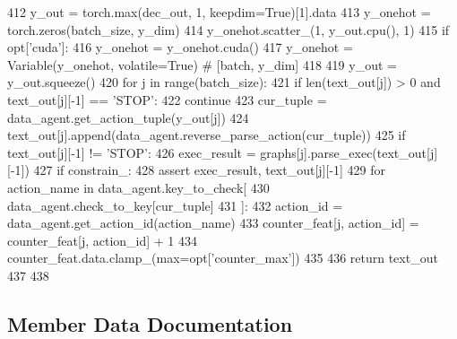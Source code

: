 \begin{DoxyCode}
412             y\_out = torch.max(dec\_out, 1, keepdim=\textcolor{keyword}{True})[1].data
413             y\_onehot = torch.zeros(batch\_size, y\_dim)
414             y\_onehot.scatter\_(1, y\_out.cpu(), 1)
415             \textcolor{keywordflow}{if} opt[\textcolor{stringliteral}{'cuda'}]:
416                 y\_onehot = y\_onehot.cuda()
417             y\_onehot = Variable(y\_onehot, volatile=\textcolor{keyword}{True})  \textcolor{comment}{# [batch, y\_dim]}
418 
419             y\_out = y\_out.squeeze()
420             \textcolor{keywordflow}{for} j \textcolor{keywordflow}{in} range(batch\_size):
421                 \textcolor{keywordflow}{if} len(text\_out[j]) > 0 \textcolor{keywordflow}{and} text\_out[j][-1] == \textcolor{stringliteral}{'STOP'}:
422                     \textcolor{keywordflow}{continue}
423                 cur\_tuple = data\_agent.get\_action\_tuple(y\_out[j])
424                 text\_out[j].append(data\_agent.reverse\_parse\_action(cur\_tuple))
425                 \textcolor{keywordflow}{if} text\_out[j][-1] != \textcolor{stringliteral}{'STOP'}:
426                     exec\_result = graphs[j].parse\_exec(text\_out[j][-1])
427                     \textcolor{keywordflow}{if} constrain\_:
428                         \textcolor{keyword}{assert} exec\_result, text\_out[j][-1]
429                     \textcolor{keywordflow}{for} action\_name \textcolor{keywordflow}{in} data\_agent.key\_to\_check[
430                         data\_agent.check\_to\_key[cur\_tuple]
431                     ]:
432                         action\_id = data\_agent.get\_action\_id(action\_name)
433                         counter\_feat[j, action\_id] = counter\_feat[j, action\_id] + 1
434                     counter\_feat.data.clamp\_(max=opt[\textcolor{stringliteral}{'counter\_max'}])
435 
436         \textcolor{keywordflow}{return} text\_out
437 
438 
\end{DoxyCode}


\subsection{Member Data Documentation}
\mbox{\label{classprojects_1_1mastering__the__dungeon_1_1agents_1_1graph__world2_1_1models_1_1ObjectChecklistModel_a0d26203b56b4baf2a8a3525118593771}} 
